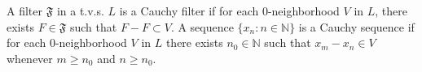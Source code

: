 A filter $\mathfrak{F}$ in a t.v.s. $L$ is a Cauchy filter if for each 0-neighborhood $V$ in $L$, there exists $F \in \mathfrak{F}$ such that $F - F \subset V$. A sequence $\{x_n : n \in \mathbb{N}\}$ is a Cauchy sequence if for each 0-neighborhood $V$ in $L$ there exists $n_0 \in \mathbb{N}$ such that $x_m - x_n \in V$ whenever $m \geq n_0$ and $n \geq n_0$.
